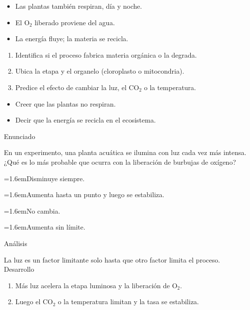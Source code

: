 \documentclass[10pt,a4paper,twocolumn]{article}
\newcommand{\alternativa}[2]{\par\noindent\hangindent=1.6em\hangafter=1\makebox[1.6em][l]{\tecla{#1}}#2\par}
\newcommand{\clave}[1]{\par\smallskip{\sffamily\footnotesize\color{esmeralda} Clave \teclaok{#1}}\par}
\begin{document}
\begin{ideasclave}
\begin{itemize}
  \item Las plantas también respiran, día y noche.
  \item El $\mathrm{O_2}$ liberado proviene del agua.
  \item La energía fluye; la materia se recicla.
\end{itemize}
\end{ideasclave}

\begin{metodo}
\begin{enumerate}
  \item Identifica si el proceso fabrica materia orgánica o la degrada.
  \item Ubica la etapa y el organelo (cloroplasto o mitocondria).
  \item Predice el efecto de cambiar la luz, el $\mathrm{CO_2}$ o la temperatura.
\end{enumerate}
\end{metodo}

\begin{errorfrecuente}
\begin{itemize}
  \item Creer que las plantas no respiran.
  \item Decir que la energía se recicla en el ecosistema.
\end{itemize}
\end{errorfrecuente}

\begin{ejemplo}
{\sffamily\footnotesize\color{zinc500} Enunciado}\par
En un experimento, una planta acuática se ilumina con luz cada vez más intensa. ¿Qué es lo más probable que ocurra con la liberación de burbujas de oxígeno?
\alternativa{A}{Disminuye siempre.}
\alternativa{B}{Aumenta hasta un punto y luego se estabiliza.}
\alternativa{C}{No cambia.}
\alternativa{D}{Aumenta sin límite.}
\clave{B}
{\sffamily\footnotesize\color{zinc500} Análisis}\par La luz es un factor limitante solo hasta que otro factor limita el proceso.
{\sffamily\footnotesize\color{zinc500} Desarrollo}
\begin{enumerate}
  \item Más luz acelera la etapa luminosa y la liberación de $\mathrm{O_2}$.
  \item Luego el $\mathrm{CO_2}$ o la temperatura limitan y la tasa se estabiliza.
\end{enumerate}
\end{ejemplo}
\end{document}
